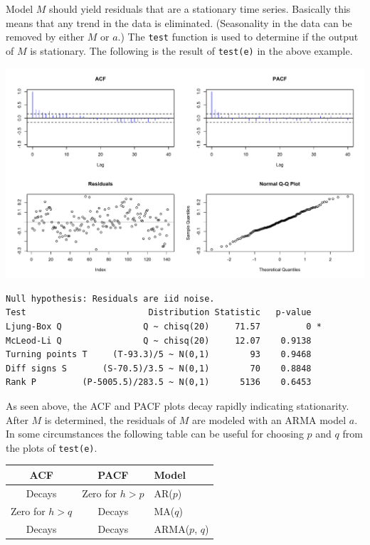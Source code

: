 \documentclass[12pt]{article}
\begin{document}
Model $M$ should yield residuals that are a stationary time series.
Basically this means that any trend in the data is eliminated.
(Seasonality in the data can be removed by either $M$ or $a$.)
The {\tt test} function is used to determine if the output of $M$ is stationary.
The following is the result of {\tt test(e)} in the above example.

\begin{center}
\includegraphics[scale=0.3]{Rplot-5.pdf}
\end{center}

\begin{verbatim}
Null hypothesis: Residuals are iid noise.
Test                        Distribution Statistic   p-value
Ljung-Box Q                Q ~ chisq(20)     71.57         0 *
McLeod-Li Q                Q ~ chisq(20)     12.07    0.9138
Turning points T     (T-93.3)/5 ~ N(0,1)        93    0.9468
Diff signs S       (S-70.5)/3.5 ~ N(0,1)        70    0.8848
Rank P         (P-5005.5)/283.5 ~ N(0,1)      5136    0.6453
\end{verbatim}

As seen above, the ACF and PACF plots decay rapidly indicating stationarity.
After $M$ is determined, the residuals of $M$ are
modeled with an ARMA model $a$.
In some circumstances
the following table can be useful for choosing $p$ and $q$ from the
plots of \verb$test(e)$.

\begin{center}
\begin{tabular}{|c|c|l|}
\hline
ACF & PACF & Model\\
\hline
Decays & Zero for $h>p$ & AR($p$)\\
Zero for $h>q$ & Decays & MA($q$)\\
Decays & Decays & ARMA($p$, $q$)\\
\hline
\end{tabular}
\end{center}
\end{document}

